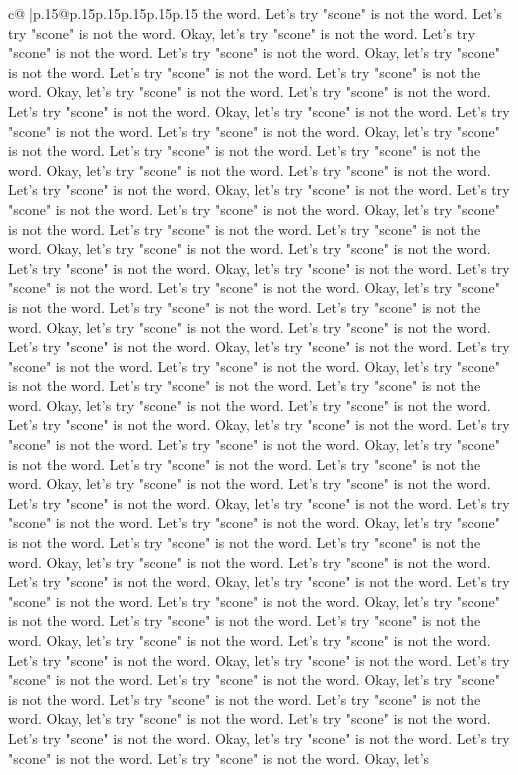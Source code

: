 \documentclass{article}
\begin{document}
{\begin{supertabular}{c@{$\;$}|p{.15\linewidth}@{}p{.15\linewidth}p{.15\linewidth}p{.15\linewidth}p{.15\linewidth}p{.15\linewidth}}
{{{the word. Let's try "scone" is not the word. Let's try "scone" is not the word. Okay, let's try "scone" is not the word. Let's try "scone" is not the word. Let's try "scone" is not the word. Okay, let's try "scone" is not the word. Let's try "scone" is not the word. Let's try "scone" is not the word. Okay, let's try "scone" is not the word. Let's try "scone" is not the word. Let's try "scone" is not the word. Okay, let's try "scone" is not the word. Let's try "scone" is not the word. Let's try "scone" is not the word. Okay, let's try "scone" is not the word. Let's try "scone" is not the word. Let's try "scone" is not the word. Okay, let's try "scone" is not the word. Let's try "scone" is not the word. Let's try "scone" is not the word. Okay, let's try "scone" is not the word. Let's try "scone" is not the word. Let's try "scone" is not the word. Okay, let's try "scone" is not the word. Let's try "scone" is not the word. Let's try "scone" is not the word. Okay, let's try "scone" is not the word. Let's try "scone" is not the word. Let's try "scone" is not the word. Okay, let's try "scone" is not the word. Let's try "scone" is not the word. Let's try "scone" is not the word. Okay, let's try "scone" is not the word. Let's try "scone" is not the word. Let's try "scone" is not the word. Okay, let's try "scone" is not the word. Let's try "scone" is not the word. Let's try "scone" is not the word. Okay, let's try "scone" is not the word. Let's try "scone" is not the word. Let's try "scone" is not the word. Okay, let's try "scone" is not the word. Let's try "scone" is not the word. Let's try "scone" is not the word. Okay, let's try "scone" is not the word. Let's try "scone" is not the word. Let's try "scone" is not the word. Okay, let's try "scone" is not the word. Let's try "scone" is not the word. Let's try "scone" is not the word. Okay, let's try "scone" is not the word. Let's try "scone" is not the word. Let's try "scone" is not the word. Okay, let's try "scone" is not the word. Let's try "scone" is not the word. Let's try "scone" is not the word. Okay, let's try "scone" is not the word. Let's try "scone" is not the word. Let's try "scone" is not the word. Okay, let's try "scone" is not the word. Let's try "scone" is not the word. Let's try "scone" is not the word. Okay, let's try "scone" is not the word. Let's try "scone" is not the word. Let's try "scone" is not the word. Okay, let's try "scone" is not the word. Let's try "scone" is not the word. Let's try "scone" is not the word. Okay, let's try "scone" is not the word. Let's try "scone" is not the word. Let's try "scone" is not the word. Okay, let's try "scone" is not the word. Let's try "scone" is not the word. Let's try "scone" is not the word. Okay, let's try "scone" is not the word. Let's try "scone" is not the word. Let's try "scone" is not the word. Okay, let's try "scone" is not the word. Let's try "scone" is not the word. Let's try "scone" is not the word. Okay, let's try "scone" is not the word. Let's try "scone" is not the word. Let's try "scone" is not the word. Okay, let's try "scone" is not the word. Let's try "scone" is not the word. Let's try "scone" is not the word. Okay, let's }}}
\end{supertabular}}
\end{document}
